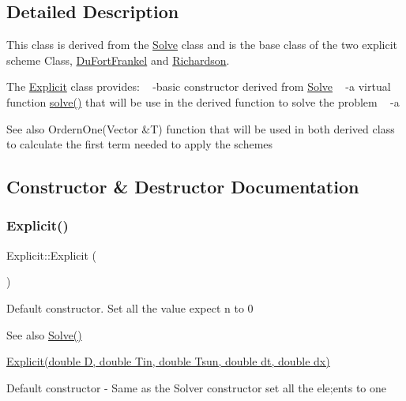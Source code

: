 \subsection{Detailed Description}
This class is derived from the \hyperlink{class_solve}{Solve} class and is the base class of the two explicit scheme Class, \hyperlink{class_du_fort_frankel}{Du\+Fort\+Frankel} and \hyperlink{class_richardson}{Richardson}.

The \hyperlink{class_explicit}{Explicit} class provides\+: ~\newline
-\/basic constructor derived from \hyperlink{class_solve}{Solve} ~\newline
-\/a virtual function \hyperlink{class_explicit_ac99aa17bfd95f66b33e5c0ecf0e53785}{solve()} that will be use in the derived function to solve the problem ~\newline
-\/a \begin{DoxySeeAlso}{See also}
Ordern\+One(\+Vector \&\+T) function that will be used in both derived class to calculate the first term needed to apply the schemes 
\end{DoxySeeAlso}


\subsection{Constructor \& Destructor Documentation}
\mbox{\label{class_explicit_a7534f9c32911234d06bec7f47ad7596e}} 
\subsubsection{\texorpdfstring{Explicit()}{Explicit()}\hspace{0.1cm}{\footnotesize\ttfamily [1/2]}}
{\footnotesize\ttfamily Explicit\+::\+Explicit (\begin{DoxyParamCaption}{ }\end{DoxyParamCaption})}

Default constructor. Set all the value expect n to 0 \begin{DoxySeeAlso}{See also}
\hyperlink{class_solve_ac437f1307c9d4669205ac7d370a55ffc}{Solve()} 

\hyperlink{class_explicit_ab5b890fae2ea8a91c95e9a15f552f36a}{Explicit(double D, double Tin, double Tsun, double dt, double dx)}
\end{DoxySeeAlso}
Default constructor -\/ Same as the Solver constructor set all the ele;ents to one \mbox{\label{class_explicit_ab5b890fae2ea8a91c95e9a15f552f36a}} 
